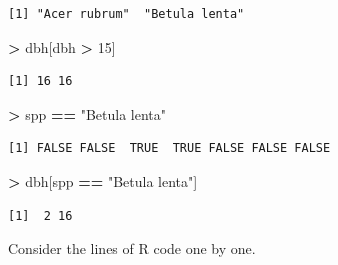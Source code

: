\documentclass[]{krantz}
\makeatletter
\newenvironment{Shaded}{\begin{snugshade}}{\end{snugshade}}
\newcommand{\DecValTok}[1]{\textcolor[rgb]{0.06,0.06,0.06}{#1}}
\newcommand{\StringTok}[1]{\textcolor[rgb]{0.5,0.5,0.5}{#1}}
\newcommand{\OperatorTok}[1]{\textcolor[rgb]{0.43,0.43,0.43}{\textbf{#1}}}
\newcommand{\NormalTok}[1]{#1}
\newenvironment{kframe}{%
\medskip{}
\setlength{\fboxsep}{.8em}
 \def\at@end@of@kframe{}%
 \ifinner\ifhmode%
  \def\at@end@of@kframe{\end{minipage}}%
  \begin{minipage}{\columnwidth}%
 \fi\fi%
 \def\FrameCommand##1{\hskip\@totalleftmargin \hskip-\fboxsep
 \colorbox{shadecolor}{##1}\hskip-\fboxsep
     \hskip-\linewidth \hskip-\@totalleftmargin \hskip\columnwidth}%
 \MakeFramed {\advance\hsize-\width
   \@totalleftmargin\z@ \linewidth\hsize
   \@setminipage}}%
 {\par\unskip\endMakeFramed%
 \at@end@of@kframe}
\renewenvironment{Shaded}{\begin{kframe}}{\end{kframe}}
\theoremstyle{definition}
\theoremstyle{definition}
\theoremstyle{definition}
\theoremstyle{remark}
\makeatother
\begin{document}
\begin{verbatim}
[1] "Acer rubrum"  "Betula lenta"
\end{verbatim}

\begin{Shaded}
\begin{Highlighting}[]
\OperatorTok{>}\StringTok{ }\NormalTok{dbh[dbh }\OperatorTok{>}\StringTok{ }\DecValTok{15}\NormalTok{]}
\end{Highlighting}
\end{Shaded}

\begin{verbatim}
[1] 16 16
\end{verbatim}

\begin{Shaded}
\begin{Highlighting}[]
\OperatorTok{>}\StringTok{ }\NormalTok{spp }\OperatorTok{==}\StringTok{ "Betula lenta"}
\end{Highlighting}
\end{Shaded}

\begin{verbatim}
[1] FALSE FALSE  TRUE  TRUE FALSE FALSE FALSE
\end{verbatim}

\begin{Shaded}
\begin{Highlighting}[]
\OperatorTok{>}\StringTok{ }\NormalTok{dbh[spp }\OperatorTok{==}\StringTok{ "Betula lenta"}\NormalTok{]}
\end{Highlighting}
\end{Shaded}

\begin{verbatim}
[1]  2 16
\end{verbatim}

Consider the lines of R code one by one.
\end{document}

